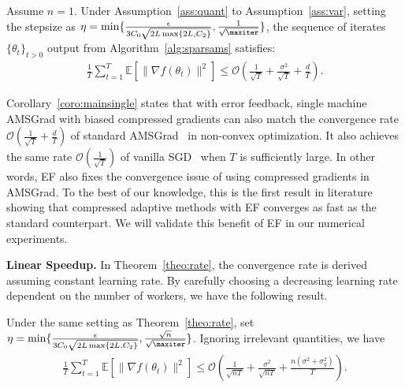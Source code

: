 \documentclass[11pt]{article}
\begin{document}
\begin{Corollary}\label{coro:mainsingle}
Assume $n=1$. Under Assumption~\ref{ass:quant} to Assumption~\ref{ass:var}, setting the stepsize as $\eta = \min\{\frac{\epsilon}{3C_0\sqrt{2L \max\{2L,C_2\}}}, \frac{1}{\sqrt{\maxiter}}\}$, the sequence of iterates $\{\theta_t\}_{t>0}$ output from Algorithm~\ref{alg:sparsams} satisfies:
\begin{align*}
    \frac{1}{T}\sum_{t=1}^T \mathbb E[\|\nabla f(\theta_t)\|^2]\leq \mathcal O(\frac{1}{\sqrt{T}}+ \frac{\sigma^2}{\sqrt T}+\frac{d}{T}).
\end{align*}
\end{Corollary}

Corollary~\ref{coro:mainsingle} states that with error feedback, single machine AMSGrad with biased compressed gradients can also match the convergence rate $\mathcal O(\frac{1}{\sqrt{T}}+\frac{d}{T})$ of standard AMSGrad~\cite{Arxiv:Zhou_18} in non-convex optimization. It also achieves the same rate $\mathcal O(\frac{1}{\sqrt T})$ of vanilla SGD~\cite{karimireddy2019error} when $T$ is sufficiently large. In other words, EF also fixes the convergence issue of using compressed gradients in AMSGrad. To the best of our knowledge, this is the first result in literature showing that compressed adaptive methods with EF converges as fast as the standard counterpart. We will validate this benefit of EF in our numerical experiments.

\textbf{Linear Speedup.} In Theorem~\ref{theo:rate}, the convergence rate is derived assuming constant learning rate. By carefully choosing a decreasing learning rate dependent on the number of workers, we have the following result.

\begin{Corollary}\label{coro:linear speedup}
Under the same setting as Theorem~\ref{theo:rate}, set $\eta = \min\{\frac{\epsilon}{3C_0\sqrt{2L \max\{2L,C_2\}}}, \frac{\sqrt n}{\sqrt{\maxiter}}\}$. Ignoring irrelevant quantities, we have
\begin{align}
    \frac{1}{T}\sum_{t=1}^T \mathbb E[\|\nabla f(\theta_t)\|^2]\leq \mathcal O(\frac{1}{\sqrt{nT}}+\frac{\sigma^2}{\sqrt{nT}}+\frac{n(\sigma^2+\sigma_g^2)}{T}).  \label{label:eq:linear speedup}
\end{align}
\end{Corollary}
\end{document}
